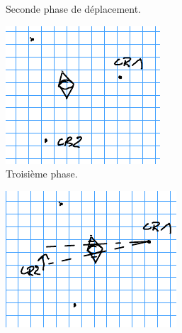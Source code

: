 \documentclass[english,RandD]{rapportPFE}  %
\begin{document}
\begin{figure}[h!]
\begin{subfigure}[t]{0.3\linewidth}
						\caption{Seconde phase de déplacement.}
						\label{fig:triangle_4}
					\end{subfigure}
					\hfill
					\begin{subfigure}[t]{0.3\linewidth}
						\centering
						\includegraphics[width=\linewidth]{graphics/triangle_5.png}
						\caption{Troisième phase.}
						\label{fig:triangle_5}
					\end{subfigure}
					\hfill
					\begin{subfigure}[t]{0.3\linewidth}
						\centering
						\includegraphics[width=\linewidth]{graphics/triangle_6.png}

\end{subfigure}
\end{figure}
\end{document}
